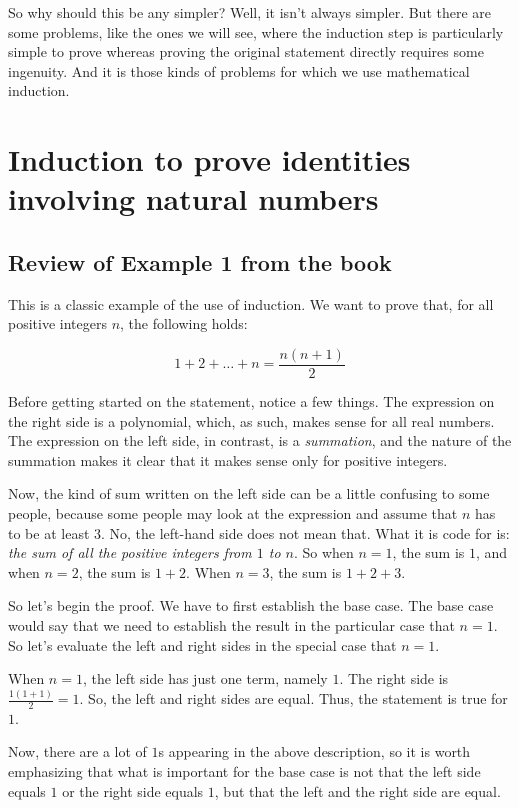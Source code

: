 \documentclass{amsart}
\begin{document}
So why should this be any simpler? Well, it isn't always simpler. But
there are some problems, like the ones we will see, where the
induction step is particularly simple to prove whereas proving the
original statement directly requires some ingenuity. And it is those
kinds of problems for which we use mathematical induction.

\section{Induction to prove identities involving natural numbers}

\subsection{Review of Example 1 from the book}

This is a classic example of the use of induction. We want to prove
that, for all positive integers $n$, the following holds:

\begin{equation*}
  1 + 2 + \dots + n = \frac{n(n+1)}{2}
\end{equation*}

Before getting started on the statement, notice a few things. The
expression on the right side is a polynomial, which, as such, makes
sense for all real numbers. The expression on the left side, in
contrast, is a {\em summation}, and the nature of the summation makes
it clear that it makes sense only for positive integers.

Now, the kind of sum written on the left side can be a little
confusing to some people, because some people may look at the
expression and assume that $n$ has to be at least $3$. No, the
left-hand side does not mean that. What it is code for is: {\em the
sum of all the positive integers from $1$ to $n$}. So when $n = 1$,
the sum is $1$, and when $n = 2$, the sum is $1 + 2$. When $n = 3$,
the sum is $1 + 2 + 3$.

So let's begin the proof. We have to first establish the base
case. The base case would say that we need to establish the result in
the particular case that $n = 1$. So let's evaluate the left and right
sides in the special case that $n = 1$.

When $n = 1$, the left side has just one term, namely $1$. The right
side is $\frac{1(1 + 1)}{2} = 1$. So, the left and right sides are
equal. Thus, the statement is true for $1$.

Now, there are a lot of $1$s appearing in the above description, so it
is worth emphasizing that what is important for the base case is not
that the left side equals $1$ or the right side equals $1$, but that
the left and the right side are equal.
\end{document}
